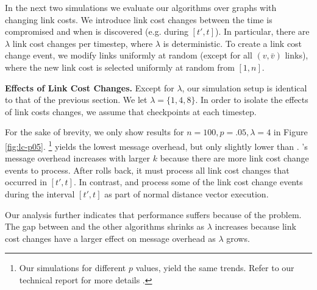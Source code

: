 In the next two simulations we evaluate our algorithms over graphs with changing link costs. We introduce link cost changes between the time \bad is compromised and when \bad is discovered 
(e.g. during $[t',t]$). 
In particular, there are $\lambda$ link cost changes per timestep, where $\lambda$ is deterministic. 
To create a link cost change event, we modify links uniformly at random (except for all $(v,\bar{v})$ links), where the new link cost is selected uniformly at random from $[1,n]$. 



{\bf Effects of Link Cost Changes.}
Except for $\lambda$, our simulation setup is identical to that of the previous section. We let $\lambda = \{1,4,8\}$. In order to isolate the effects of link costs changes,
we assume that \cpr checkpoints at each timestep.

For the sake of brevity, we only show results for $n=100,p=.05, \lambda=4$ in Figure \ref{fig:lc-p05}.  
{\footnote {\small Our simulations for different $p$ values, yield the same trends.  Refer to our technical report for more details \cite{TechRollback10}.}}
\purge yields the lowest message overhead, but only slightly lower than \cprs. 
\cprs's message overhead increases with larger $k$ because there are more link cost change events to process. After \cpr rolls back, it must process all link cost
changes that occurred in $[t',t]$. 
In contrast, \second and \purge process some of the link cost change events during the interval $[t',t]$ as part of normal distance vector execution. 

Our analysis further indicates that \second performance suffers because of the \infinity problem. 
The gap between \second and the other algorithms shrinks as $\lambda$ increases because link cost changes have a larger effect on message overhead as $\lambda$ grows.



